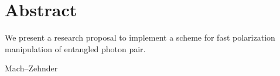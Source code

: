 \chapter*{Abstract}

We present a research proposal to implement a scheme for fast polarization manipulation of entangled photon pair.
\cite{Varo2022}
\cite{Fognini18} 

	Mach–Zehnder


